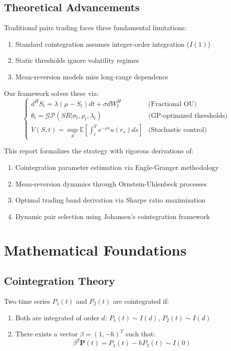 \documentclass[article]{arithmaxresearch}
\begin{document}
\subsection{Theoretical Advancements}
Traditional pairs trading faces three fundamental limitations:
\begin{enumerate}
    \item Standard cointegration assumes integer-order integration ($I(1)$)
    \item Static thresholds ignore volatility regimes
    \item Mean-reversion models miss long-range dependence
\end{enumerate}

Our framework solves these via:
\begin{equation*}
\begin{cases}
d^H S_t = \lambda(\mu - S_t)dt + \sigma dW_t^H & \text{(Fractional OU)} \\
\theta_t = \mathcal{GP}(SR|\sigma_t, \rho_t, \lambda_t) & \text{(GP-optimized thresholds)} \\
V(S,t) = \sup_{\theta} \mathbb{E}[\int_t^T e^{-\rho s} u(r_s)ds] & \text{(Stochastic control)}
\end{cases}
\end{equation*}

This report formalizes the strategy with rigorous derivations of:
\begin{enumerate}
    \item Cointegration parameter estimation via Engle-Granger methodology
    \item Mean-reversion dynamics through Ornstein-Uhlenbeck processes
    \item Optimal trading band derivation via Sharpe ratio maximization
    \item Dynamic pair selection using Johansen's cointegration framework
\end{enumerate}

\section{Mathematical Foundations}

\subsection{Cointegration Theory}

Two time series $P_1(t)$ and $P_2(t)$ are cointegrated if:
\begin{enumerate}
    \item Both are integrated of order $d$: $P_1(t) \sim I(d)$, $P_2(t) \sim I(d)$
    \item There exists a vector $\beta = (1, -h)^T$ such that:
    \begin{equation}
    \beta^T \mathbf{P}(t) = P_1(t) - hP_2(t) \sim I(0)
    \end{equation}
\end{enumerate}
\end{document}
